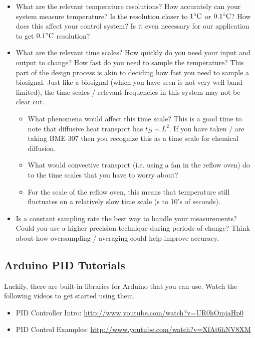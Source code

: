 \documentclass[10pt]{report}
\begin{document}
\begin{itemize}
\item What are the relevant temperature resolutions? How accurately can your system measure temperature? Is the resolution closer to $1 ^{\circ}{\rm C}$ or $0.1 ^{\circ}{\rm C}$? How does this affect your control system? Is it even necessary for our application to get $ 0.1 ^{\circ}{\rm C}$ resolution?

\item 
What are the relevant time scales? How quickly do you need your input and output to change? How fast do you need to sample the temperature? This part of the design process is akin to deciding how fast you need to sample a biosignal. Just like a biosignal (which you have seen is not very well band-limited), the time scales / relevant frequencies in this system may not be clear cut. 
	\begin{itemize}
		\item 
		What phenomena would affect this time scale? This is a good time to note that diffusive heat transport has ${t}_D \sim L^2$. If you have taken / are 			taking BME 307 then you recognize this as a time scale for chemical diffusion. 
		\item
		What would convective transport (i.e. using a fan in the reflow oven) do to the time scales that you have to worry about?
		\item
		For the scale of the reflow oven, this means that temperature still fluctuates on a relatively slow time scale (s to 10’s of seconds).
	\end{itemize}

\item 	Is a constant sampling rate the best way to handle your measurements? Could you use a higher precision technique during periods of change? Think about how oversampling / averaging could help improve accuracy.

\end{itemize}

\subsection*{Arduino PID Tutorials}

\par Luckily, there are built-in libraries for Arduino that you can use. Watch the following videos to get started using them.
\begin{itemize}
\item PID Controller Intro: 
\url {http://www.youtube.com/watch?v=UR0hOmjaHp0}
\item PID Control Examples:
\url{http://www.youtube.com/watch?v=XfAt6hNV8XM}
\end{itemize}
\end{document}
